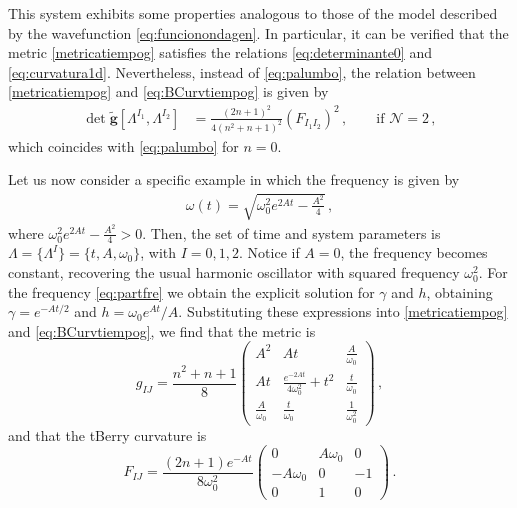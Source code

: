 \documentclass[12pt]{iopart}
\begin{document}
This system exhibits some properties analogous to those of the model described by the wavefunction \eqref{eq:funcionondagen}. In particular, it can be verified that the metric \eqref{metricatiempog} satisfies the relations \eqref{eq:determinante0} and \eqref{eq:curvatura1d}. Nevertheless, instead of \eqref{eq:palumbo}, the relation between \eqref{metricatiempog} and \eqref{eq:BCurvtiempog} is given by
\begin{align}
    \det\tilde{ \boldsymbol{g}}[ \Lambda^{\scriptscriptstyle I_1},\Lambda^{ \scriptscriptstyle I_2}]&= \frac{(2n+1)^2}{4 (n^2+n+1)^2}\left(F_{\scriptscriptstyle I_1 I_2} \right)^2 \,, \qquad \mathrm{if} \, \, \mathcal{N}=2\,, \label{eq:Palumbdomodi}
\end{align}
which coincides with \eqref{eq:palumbo} for $n=0$.

Let us now consider a specific example in which the frequency is given by
\begin{align}
\omega(t)=\sqrt{\omega_0^2e^{2At}-\frac{A^2}{4}}\,, \label{eq:partfre}
\end{align}
where $\omega_0^2e^{2At}-\frac{A^2}{4}>0$. Then, the set of time and system parameters is $\Lambda=\{\Lambda^I\}=\{ t, A, \omega_0 \}$, with $I=0,1,2$. Notice if $A=0$, the frequency becomes constant, recovering the usual harmonic oscillator with squared frequency $\omega^2_0$. For the frequency \eqref{eq:partfre} we obtain the explicit solution for $\gamma$ and $h$, obtaining $\gamma=e^{-At/2}$ and $h=\omega_0 e^{At}/A$. Substituting these expressions into \eqref{metricatiempog} and \eqref{eq:BCurvtiempog}, we find that the  metric is
\begin{equation}
g_{IJ}=\frac{n^2+n+1}{8}\begin{pmatrix}
A^2 & At & \frac{A}{\omega_0}\\
At & \frac{e^{-2At}}{4\omega_0^2}+t^2 & \frac{t}{\omega_0}\\
 \frac{A}{\omega_0} & \frac{t}{\omega_0} & \frac{1}{\omega_0^2}
\end{pmatrix}\,,
\end{equation}
and that the tBerry curvature is
\begin{equation}
F_{IJ}=\frac{(2n+1)e^{-At} }{8\omega_0^2}\begin{pmatrix}
0 & A\omega_0 & 0\\
- A\omega_0  & 0 & -1\\
0 &   1& 0
\end{pmatrix}\,. \label{eq:curt}
\end{equation}
\end{document}
